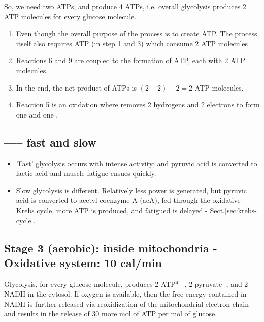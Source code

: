 So, we need two ATPs, and produce 4 ATPs, i.e. overall glycolysis produces 2 ATP
molecules for every glucose molecule.
\begin{enumerate}
\item Even though the overall purpose of the process is to create
  ATP. The process itself also requires ATP (in step 1 and 3) which
  consume 2 ATP molecules

\item Reactions 6 and 9 are coupled to the formation of ATP, each with
  2 ATP molecules.

\item In the end, the net product of ATPs is $(2+2) - 2 = 2$ ATP molecules.

\item Reaction 5 is an oxidation where  removes 2 hydrogens and 2
  electrons to form one  and one .

\end{enumerate}

\subsection{----- fast and slow}

\begin{itemize}
  \item  'Fast' glycolysis occurs with intense activity; and pyruvic acid is
  converted to lactic acid and muscle fatigue ensues quickly.

  \item Slow glycolysis is different. Relatively less power is generated, but
pyruvic acid is converted to acetyl coenzyme A (acA), fed through the oxidative
Krebs cycle, more ATP is produced, and fatigued is delayed -
Sect.\ref{sec:krebs-cycle}.

\end{itemize}



\subsection{Stage 3 (aerobic): inside mitochondria - Oxidative system: 10
cal/min}
\label{sec:stage-3}
\label{sec:oxidative-system}

Glycolysis, for every glucose molecule, produces 2 ATP$^{4-}$, 2 pyruvate$^{-}$,
and 2 NADH in the cytosol. If oxygen is available, then the free energy
contained in NADH is further released via reoxidization of the mitochondrial
electron chain and results in the release of 30 more mol of ATP per mol of
glucose.

